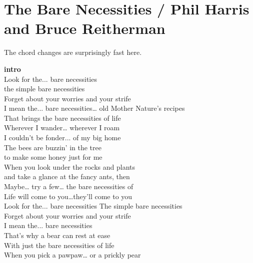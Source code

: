 \section{The Bare Necessities / Phil Harris and Bruce Reitherman}\label{sec:barenecessities}
{\small The chord changes are surprisingly fast here.}
\Gmajor
\GmajorSeven
\Cmajor
\CmajorSeven
\EmajorSeven
\AmajorSeven
\DmajorSeven
\CminorSeven

\textbf{intro} \\
Look for the...  bare necessities\\
the simple bare necessities\\
Forget about your worries and your strife \\
I mean the...  bare necessities…
old Mother Nature's recipes\\
That brings the bare necessities of life\\
Wherever I wander… wherever I roam\\
I couldn't be fonder... of my big home \\
The bees are buzzin' in the tree\\
to make some honey just for me\\
When you look under the rocks and plants\\
and take a glance at the fancy ants, then\\
Maybe… try a few… the bare necessities of\\
Life will come to you…they’ll come to you\\
Look for the...  bare necessities
The simple bare necessities\\
Forget about your worries and your strife \\
I mean the...  bare necessities\\
That's why a bear can rest at ease\\
With just the bare necessities of life\\
When you pick a pawpaw… or a prickly pear\\
